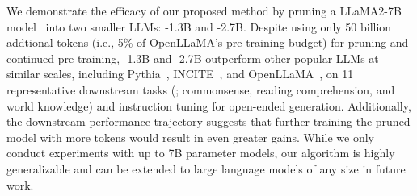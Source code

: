 We demonstrate the efficacy of our proposed method by pruning a LLaMA2-7B model~\citep{touvron2023llama2} into two smaller LLMs:
\ours{}-1.3B and 
\ours{}-2.7B. 
Despite using only 50 billion addtional tokens (i.e., 5\% of OpenLLaMA's pre-training budget) for pruning and continued pre-training,
\ours{}-1.3B and \ours{}-2.7B 
outperform other popular LLMs at similar scales, including Pythia~\citep{biderman2023pythia}, INCITE~\citep{together2023redpajama}, and OpenLLaMA~\citep{openlm2023openllama}, on 11 representative downstream tasks (; commonsense, reading comprehension, and world knowledge) and instruction tuning for open-ended generation.
Additionally, the downstream performance trajectory suggests that further training the pruned model with more tokens would result in even greater gains.
While we only conduct experiments with up to 7B parameter models, our \method{} algorithm is highly generalizable and can be extended to large language models of any size in future work.
